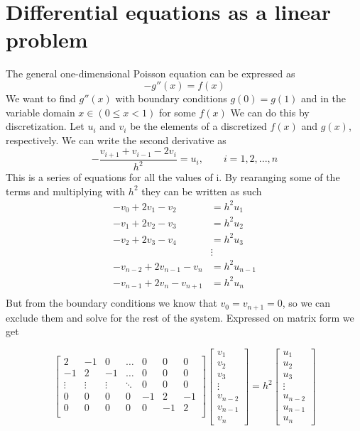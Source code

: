 \documentclass[10pt,a4paper]{article}
\begin{document}
    \section{Differential equations as a linear problem}
    The general one-dimensional Poisson equation can be expressed as
    \[
    -g''(x) = f(x)
    \]
    We want to find $g''(x)$ with boundary conditions $g(0) = g(1)$ and in the variable domain $x\in (0\leq x<1)$ for some $f(x)$
    We can do this by discretization. Let $u_i$ and $v_i$ be the elements of a discretized $f(x)$ and $g(x)$, respectively. We can write the second derivative as
    $$-\frac{v_{i+1}+v_{i-1}-2v_i}{h^2} = u_i, \qquad i = 1,2,...,n$$
    This is a series of equations for all the values of i. By rearanging some of the terms and multiplying with $h^2$ they can be written as such
    \begin{align*}
        -v_0 + 2v_1 - v_2 &= h^2u_1\\
        -v_1 + 2v_2 - v_3 &= h^2u_2\\
        -v_2 + 2v_3 - v_4 &= h^2u_3\\
        &\vdots\\
        -v_{n-2} + 2v_{n-1} - v_{n} &= h^2u_{n-1}\\
        -v_{n-1} + 2v_{n} - v_{n+1} &= h^2u_{n}\\
    \end{align*}
    But from the boundary conditions we know that $v_0 = v_{n+1} = 0$, so we can exclude them and solve for the rest of the system. Expressed on matrix form we get

    \begin{equation}\label{special matrix}
    \begin{bmatrix}
    2 & -1 & 0 & \dots & 0 & 0 & 0 \\
    -1 & 2 & -1 & \dots & 0 & 0 & 0 \\
    \vdots & \vdots & \vdots & \ddots & 0 & 0 & 0 \\
    0 & 0 & 0 & 0 & -1 & 2 & -1\\
    0 & 0 & 0 & 0 & 0 & -1 & 2 \\
    \end{bmatrix}
    \begin{bmatrix}
        v_1\\ v_2 \\ v_3 \\ \vdots \\ v_{n-2} \\v_{n-1} \\ v_{n}
    \end{bmatrix}
    =h^2
    \begin{bmatrix}
        u_1 \\ u_2 \\ u_3 \\ \vdots \\ u_{n-2} \\ u_{n-1} \\ u_{n}
    \end{bmatrix}
    \end{equation}
\end{document}
